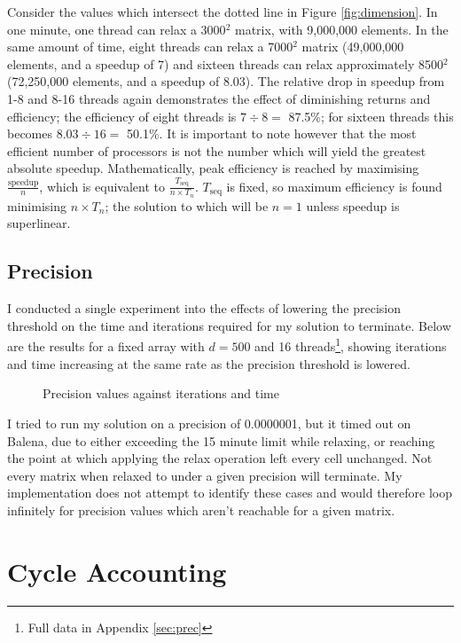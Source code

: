 \documentclass[12pt]{article}
\begin{document}
Consider the values which intersect the dotted line in Figure \ref{fig:dimension}. In one minute, one thread can relax a 3000$^2$ matrix, with 9,000,000 elements. In the same amount of time, eight threads can relax a 7000$^2$ matrix (49,000,000 elements, and a speedup of 7) and sixteen threads can relax approximately 8500$^2$ (72,250,000 elements, and a speedup of 8.03). The relative drop in speedup from 1-8 and 8-16 threads again demonstrates the effect  of diminishing returns and efficiency; the efficiency of eight threads is $7\div{}8=$ 87.5\%; for sixteen threads this becomes $8.03\div{}16=$ 50.1\%. It is important to note however that the most efficient number of processors is not the number which will yield the greatest absolute speedup. Mathematically, peak efficiency is reached by maximising $\frac{\text{speedup}}{n}$, which is equivalent to $\frac{T_\text{seq}}{n\times{T_n}}$. $T_\text{seq}$ is fixed, so maximum efficiency is found minimising $n\times{T_n}$; the solution to which will be $n=1$ unless speedup is superlinear. 

\subsection{Precision}

I conducted a single experiment into the effects of lowering the precision threshold on the time and iterations required for my solution to terminate. Below are the results for a fixed array with $d=500$ and 16 threads\footnote{Full data in Appendix \ref{sec:prec}}, showing iterations and time increasing at the same rate as the precision threshold is lowered.

\begin{figure}[h!]
	\caption{Precision values against iterations and time}
	\label{fig:precision}
\end{figure}
I tried to run my solution on a precision of 0.0000001, but it timed out on Balena, due to either exceeding the 15 minute limit while relaxing, or reaching the point at which applying the relax operation left every cell unchanged. Not every matrix when relaxed to under a given precision will terminate. My implementation does not attempt to identify these cases and would therefore loop infinitely for precision values which aren't reachable for a given matrix.

\section{Cycle Accounting}
\end{document}
